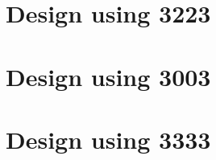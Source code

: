 
 \begin{center}




 \end{center}



\section{Design using 3223}


 \begin{center}




 \end{center}



\section{Design using 3003}


 \begin{center}




 \end{center}



\section{Design using 3333}


